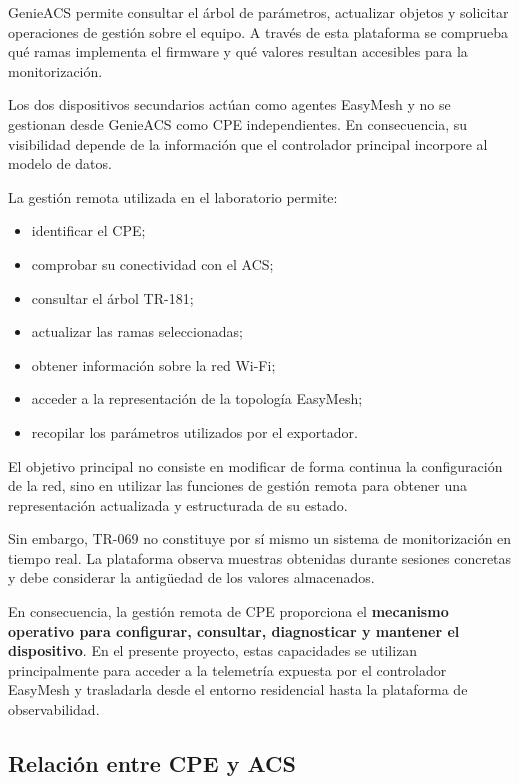 GenieACS permite consultar el árbol de parámetros, actualizar objetos y
solicitar operaciones de gestión sobre el equipo. A través de esta
plataforma se comprueba qué ramas implementa el firmware y qué valores
resultan accesibles para la monitorización.

Los dos dispositivos secundarios actúan como agentes EasyMesh y no se
gestionan desde GenieACS como CPE independientes. En consecuencia, su
visibilidad depende de la información que el controlador principal
incorpore al modelo de datos.

La gestión remota utilizada en el laboratorio permite:

\begin{itemize}
    \item identificar el CPE;
    \item comprobar su conectividad con el ACS;
    \item consultar el árbol TR-181;
    \item actualizar las ramas seleccionadas;
    \item obtener información sobre la red Wi-Fi;
    \item acceder a la representación de la topología EasyMesh;
    \item recopilar los parámetros utilizados por el exportador.
\end{itemize}

El objetivo principal no consiste en modificar de forma continua la
configuración de la red, sino en utilizar las funciones de gestión remota
para obtener una representación actualizada y estructurada de su estado.

Sin embargo, TR-069 no constituye por sí mismo un sistema de
monitorización en tiempo real. La plataforma observa muestras obtenidas
durante sesiones concretas y debe considerar la antigüedad de los valores
almacenados.

En consecuencia, la gestión remota de CPE proporciona el
\textbf{mecanismo operativo para configurar, consultar, diagnosticar y
mantener el dispositivo}. En el presente proyecto, estas capacidades se
utilizan principalmente para acceder a la telemetría expuesta por el
controlador EasyMesh y trasladarla desde el entorno residencial hasta la
plataforma de observabilidad.

\subsection{Relación entre CPE y ACS}
\label{subsec:relacion-cpe-acs}

